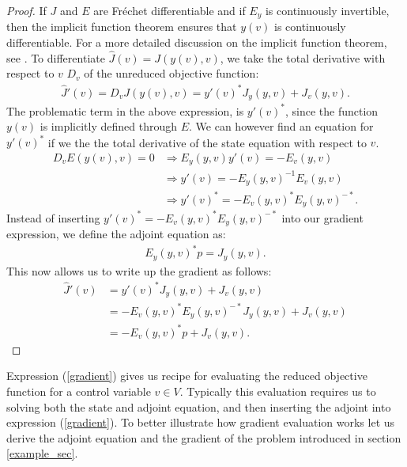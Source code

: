 \begin{proof}
If $J$ and $E$ are  Fr\'{e}chet differentiable and if $E_y$ is continuously invertible, then the implicit function theorem ensures that $y(v)$ is continuously differentiable. For a more detailed discussion on the implicit function theorem, see \cite{hinze2008optimization}. To differentiate $\hat J(v) = J(y(v),v)$, we take the total derivative with respect to $v$ $D_v$ of the unreduced objective function:
\begin{align*}
\hat J'(v)=D_vJ(y(v),v) = y'(v)^*J_y(y,v) + J_v(y,v).
\end{align*}
The problematic term in the above expression, is $y'(v)^*$, since the function $y(v)$ is implicitly defined through $E$. We can however find an equation for $y'(v)^*$ if we the the total derivative of the state equation with respect to $v$.
\begin{align*}
D_vE(y(v),v)=0 &\Rightarrow E_y(y,v)y'(v)=-E_v(y,v) \\ 
&\Rightarrow y'(v)=-E_y(y,v)^{-1}E_v(y,v) \\ 
&\Rightarrow y'(v)^* = -E_v(y,v)^*E_y(y,v)^{-*}.
\end{align*}
Instead of inserting $y'(v)^* = -E_v(y,v)^*E_y(y,v)^{-*}$ into our gradient expression, we define the adjoint equation as:
\begin{align*}
E_y(y,v)^{*}p=J_y(y,v). 
\end{align*}
This now allows us to write up the gradient as follows:
\begin{align*}
\hat{J}'(v)&= y'(v)^*J_y(y,v) + J_v(y,v)\\
&=-E_v(y,v)^*E_y(y,v)^{-*}J_y(y,v) + J_v(y,v) \\
&= -E_v(y,v)^*p +J_v(y,v). 
\end{align*}
\end{proof}
\noindent
Expression (\ref{gradient}) gives us recipe for evaluating the reduced objective function for a control variable $v\in V$. Typically this evaluation requires us to solving both the state and adjoint equation, and then inserting the adjoint into expression (\ref{gradient}). To better illustrate how gradient evaluation works let us derive the adjoint equation and the gradient of the problem introduced in section \ref{example_sec}.
